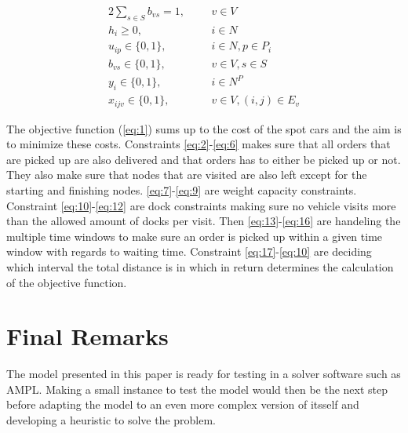 \documentclass[a4paper,12pt]{article}
\begin{document}
\begin{alignat} {2}
    \sum_{s \in S} b_{vs} = 1,							& 			&&	v \in V							\label{eq:19}\\[4]
    h_{i} \geq 0,									& 			&&	i \in N 							\label{eq:20}\\[8]
    u_{ip} \in \{0, 1\},								& 			&&	i \in N, p \in P_i 					\label{eq:21}\\[8]
    b_{vs} \in \{0, 1\},								& 			&&	v \in V, s \in S 					\label{eq:22}\\[8]
    y_i \in \{0, 1\},									& 			&&	i \in N^P 						\label{eq:23}\\[8]
    x_{ijv} \in \{0, 1\},								&			&&	v \in V, (i, j) \in E_v 				\label{eq:24}
\end{alignat}
\endgroup

\par
The objective function (\ref{eq:1}) sums up to the cost of the spot cars and the aim is to minimize these costs. 
Constraints \ref{eq:2}-\ref{eq:6} makes sure that all orders that are picked up are also delivered and that orders has to either be picked up or not. They also make sure that nodes that are visited are also left except for the starting and finishing nodes.
\ref{eq:7}-\ref{eq:9} are weight capacity constraints.
Constraint \ref{eq:10}-\ref{eq:12} are dock constraints making sure no vehicle visits more than the allowed amount of docks per visit.
Then \ref{eq:13}-\ref{eq:16} are handeling the multiple time windows to make sure an order is picked up within a given time window with regards to waiting time.
Constraint \ref{eq:17}-\ref{eq:10} are deciding which interval the total distance is in which in return determines the calculation of the objective function. \newline

\section{Final Remarks}
The model presented in this paper is ready for testing in a solver software such as AMPL. Making a small instance to test the model would then be the next step before adapting the model to an even more complex version of itsself and developing a heuristic to solve the problem. 




\end{document}
